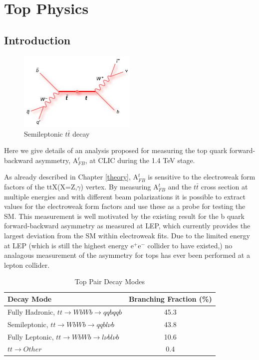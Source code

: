 \chapter{Top Physics}
\label{chapter:topanalysis}
\section{Introduction}

\begin{figure}
  \centering
  \includegraphics[width=0.5\textwidth]{TopAnalysis/figures/TopFeynmann.jpg}
  \caption[Semileptonic $t\bar{t}$ decay]{Semileptonic $t\bar{t}$ decay}
  \label{fig:topfeynmann}
\end{figure}

Here we give details of an analysis proposed for measuring the top quark forward-backward asymmetry, A$_{FB}^t$, at CLIC during the 1.4 TeV stage. 

As already described in Chapter \ref{theory}, A$_{FB}^t$ is sensitive to the electroweak form factors of the ttX(X=Z,$\gamma$) vertex. By measuring A$_{FB}^t$ and the $t\bar{t}$ cross section at multiple energies and with different beam polarizations it is possible to extract values for the electroweak form factors and use these as a probe for testing the \ac{SM}. This measurement is well motivated by the existing result for the b quark forward-backward asymmetry as measured at \ac{LEP}, which currently provides the largest deviation from the \ac{SM} within electroweak fits. Due to the limited energy at \ac{LEP} (which is still the highest energy e$^+$e$^-$ collider to have existed,) no analagous measurement of the asymmetry for tops has ever been performed at a lepton collider. 

\begin{table}
  \centering
  \begin{tabular}{l |c}
    \toprule
    Decay Mode     & Branching Fraction (\%) \\
    \midrule
    Fully Hadronic, $tt\rightarrow WbWb\rightarrow qqbqqb$ & 45.3  \\
    \midrule
    Semileptonic, $tt\rightarrow WbWb\rightarrow qqbl\nu b$ & 43.8 \\
    \midrule
    Fully Leptonic, $tt\rightarrow WbWb\rightarrow l\nu bl\nu b$ & 10.6 \\
    \midrule
    $tt\rightarrow Other$ & 0.4 \\
    \bottomrule
  \end{tabular}
  \caption{Top Pair Decay Modes}
  \label{table:topdecaymodes}
\end{table}

